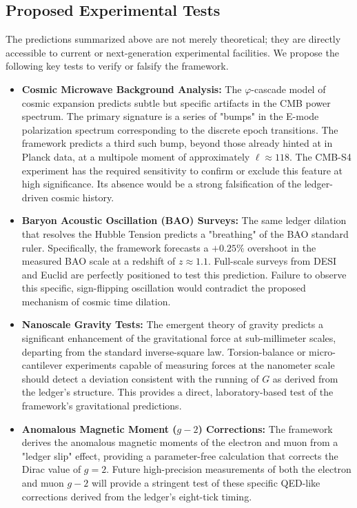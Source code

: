 \documentclass[11pt,a4paper]{article}
\begin{document}
\subsection{Proposed Experimental Tests}
The predictions summarized above are not merely theoretical; they are directly accessible to current or next-generation experimental facilities. We propose the following key tests to verify or falsify the framework.

\begin{itemize}
    \item \textbf{Cosmic Microwave Background Analysis:} The \(\varphi\)-cascade model of cosmic expansion predicts subtle but specific artifacts in the CMB power spectrum. The primary signature is a series of "bumps" in the E-mode polarization spectrum corresponding to the discrete epoch transitions. The framework predicts a third such bump, beyond those already hinted at in Planck data, at a multipole moment of approximately \(\ell \approx 118\). The CMB-S4 experiment has the required sensitivity to confirm or exclude this feature at high significance. Its absence would be a strong falsification of the ledger-driven cosmic history.

    \item \textbf{Baryon Acoustic Oscillation (BAO) Surveys:} The same ledger dilation that resolves the Hubble Tension predicts a "breathing" of the BAO standard ruler. Specifically, the framework forecasts a \(+0.25\%\) overshoot in the measured BAO scale at a redshift of \(z \approx 1.1\). Full-scale surveys from DESI and Euclid are perfectly positioned to test this prediction. Failure to observe this specific, sign-flipping oscillation would contradict the proposed mechanism of cosmic time dilation.

    \item \textbf{Nanoscale Gravity Tests:} The emergent theory of gravity predicts a significant enhancement of the gravitational force at sub-millimeter scales, departing from the standard inverse-square law. Torsion-balance or micro-cantilever experiments capable of measuring forces at the nanometer scale should detect a deviation consistent with the running of \(G\) as derived from the ledger's structure. This provides a direct, laboratory-based test of the framework's gravitational predictions.

    \item \textbf{Anomalous Magnetic Moment (\(g-2\)) Corrections:} The framework derives the anomalous magnetic moments of the electron and muon from a "ledger slip" effect, providing a parameter-free calculation that corrects the Dirac value of \(g=2\). Future high-precision measurements of both the electron and muon \(g-2\) will provide a stringent test of these specific QED-like corrections derived from the ledger's eight-tick timing.


\end{itemize}
\end{document}
